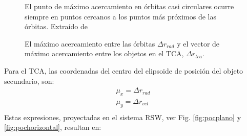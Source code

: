 {\begin{figure}[!h]
\begin{minipage}[t]{0.48\textwidth}
 \centering
 \caption[M\'aximo acercamiento en \'orbitas circulares]{El punto de m\'aximo acercamiento en \'orbitas casi circulares ocurre siempre en puntos cercanos a los puntos m\'as pr\'oximos de las \'orbitas. Extra\'ido de \cite{leichen}}
 \label{fig:pocorbcirc}
\end{minipage}
\begin{minipage}[t]{0.48\textwidth}
 \centering
 \caption[]{El m\'aximo acercamiento entre las \'orbitas $\Delta r_{rad}$ y el vector de m\'aximo acercamiento entre los objetos en el TCA, $\Delta r_{tca}$.}
 \label{fig:pocdistancia}
\end{minipage}
\end{figure}
 
Para el TCA, las coordenadas del centro del elipsoide de posici\'on del objeto secundario, son:\\
% 
\begin{gather}
 \mu_{x}=\Delta r_{rad}\\
 \mu_{y}=\Delta r_{vel}\\
\end{gather}
% 
Estas expresiones, proyectadas en el sistema RSW, ver Fig. \ref{fig:pocplano} y \ref{fig:pochorizontal}, resultan en:

}
